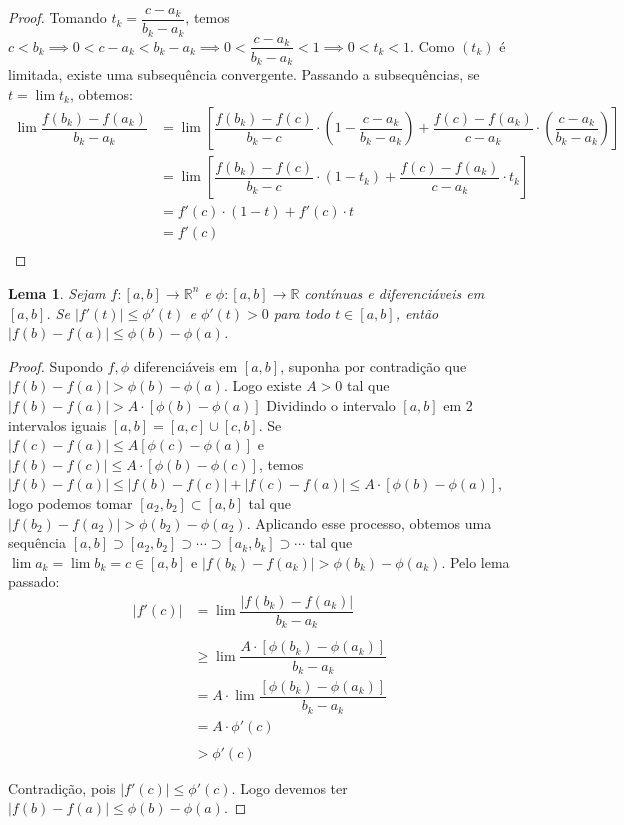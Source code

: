 \documentclass{article}
\theoremstyle{theorem}
\theoremstyle{lemma}
\newtheorem{lema}{Lema}
\theoremstyle{definition}
\theoremstyle{remark}
\begin{document}
\begin{proof}
	   Tomando \( t_k = \dfrac{c - a_k}{b_k -a_k} \), temos \( c < b_k \implies 0 < c-a_k < b_k - a_k \implies 0 < \dfrac{c-a_k}{b_k -a_k} < 1 \implies 0< t_k < 1 \).  Como \((t_k)\) é limitada, existe uma subsequência convergente.  Passando a subsequências, se $t = \lim t_k$, obtemos:  
	   \begin{align*}
		   \lim \dfrac{f(b_k) - f(a_k)}{b_k - a_k}   &= \lim \left[ \dfrac{f(b_k) - f(c) }{b_k -c} \cdot \left( 1 - \dfrac{ c- a_k}{b_k - a_k}\right)  + \dfrac{ f(c) - f(a_k)}{c - a_k } \cdot \left( \dfrac{c - a_k}{b_k - a_k}\right) \right] \\
		   &= \lim \left[ \dfrac{f(b_k) - f(c) }{b_k -c} \cdot \left( 1 - t_k \right)  + \dfrac{ f(c) - f(a_k)}{c - a_k } \cdot t_k\right] \\
		   &=  f'(c) \cdot \left( 1 - t \right)  + f'(c) \cdot t  \\
		   &=  f'(c)  \\
	   \end{align*}
   \end{proof}
   \begin{lema}
	   Sejam \(f:[a,b] \to \mathbb{R}^n\) e \(\phi: [a,b] \to \mathbb{R}\) contínuas e diferenciáveis em \( [a,b] \). Se \(|f'(t)  | \leq \phi'(t) \) e \(\phi'(t) > 0 \) para todo \( t\in [a,b] \), então \( |f(b) - f(a) | \leq \phi(b) - \phi(a) \).
   \end{lema}
   \begin{proof}
	   Supondo \(f,\phi\) diferenciáveis em \([a,b]\), suponha por contradição que \(|f(b) -f(a)| > \phi(b) - \phi(a) \). Logo existe $A>0$ tal que \(|f(b) -f(a)| >A\cdot\left[ \phi(b) - \phi(a)\right] \) Dividindo o intervalo \( [a,b] \) em 2 intervalos iguais \( [a,b] = [a,c] \cup [c,b] \). Se \( |f(c) - f(a)| \leq A \left [\phi(c) - \phi(a) \right] \) e \( |f(b) - f(c)| \leq A\cdot\left[ \phi(b) - \phi(c)\right]\), temos \( |f(b) - f(a)| \leq |f(b) - f(c)| + |f(c) - f(a)| \leq A\cdot [ \phi(b) - \phi(a) ] \), logo podemos tomar \( [a_2, b_2] \subset [a,b] \) tal que \( |f(b_2) - f(a_2)| > \phi(b_2) - \phi(a_2) \). Aplicando esse processo, obtemos uma sequência \([a,b] \supset [a_2, b_2] \supset \cdots \supset [a_k, b_k] \supset \cdots  \) tal que \(\lim a_k = \lim b_k = c \in [a,b]\) e \( |f(b_k) - f(a_k)| > \phi(b_k) - \phi(a_k) \). Pelo lema passado:
	   \begin{align*}
		   |f'(c) | &= \lim \dfrac{|f(b_k) - f(a_k)|}{b_k -a_k} \\~\\
		   &\geq \lim \dfrac{A\cdot \left[ \phi(b_k) - \phi(a_k)\right]}{b_k-a_k} \\
		   &= A\cdot\lim \dfrac{ \left[ \phi(b_k) - \phi(a_k)\right]}{b_k-a_k} \\
		   &= A\cdot \phi'(c) \\~\\
		   &> \phi'(c)
	   \end{align*}

	   Contradição, pois $|f'(c)| \leq \phi'(c)$. Logo devemos ter $|f(b) - f(a)|\leq \phi(b) - \phi(a)$.
   \end{proof}
\end{document}
